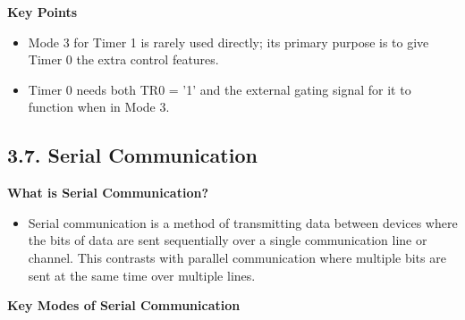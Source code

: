 \documentclass[
]{article}
\begin{document}
\textbf{Key Points}

\begin{itemize}
\item
  Mode 3 for Timer 1 is rarely used directly; its primary purpose is to
  give Timer 0 the extra control features.
\item
  Timer 0 needs both TR0 = '1' and the external gating signal for it to
  function when in Mode 3.
\end{itemize}

\hypertarget{37-serial-communication}{%
\subsection{3.7. Serial Communication}\label{37-serial-communication}}

\textbf{What is Serial Communication?}

\begin{itemize}
\item
  Serial communication is a method of transmitting data between devices
  where the bits of data are sent sequentially over a single
  communication line or channel. This contrasts with parallel
  communication where multiple bits are sent at the same time over
  multiple lines.
\end{itemize}

\textbf{Key Modes of Serial Communication}
\end{document}
